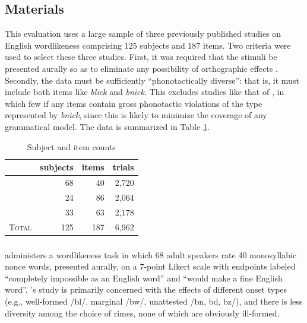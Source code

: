 \subsection{Materials}

This evaluation uses a large sample of three previously published studies on English wordlikeness comprising 125 subjects and 187 items. Two criteria were used to select these three studies. First, it was required that the stimuli be presented aurally so as to eliminate any possibility of orthographic effects \citep[e.g.,][]{Berent2001b,Berent2008b}. Secondly, the data must be sufficiently ``phonotactically diverse'': that is, it must include both items like \emph{blick} and \emph{bnick}. This excludes studies like that of \citet{Bailey2001}, in which few if any items contain gross phonotactic violations of the type represented by \emph{bnick}, since this is likely to minimize the coverage of any grammatical model. The data is summarized in Table \ref{counts}.

\begin{table}
\centering
\begin{tabular}{l rrr}
\toprule
                           & subjects & items & trials \\
\midrule
\citeauthor{Albright2007}  & 68       & 40    & 2,720  \\
\citeauthor{Albright2003b} & 24       & 86    & 2,064  \\
\citeauthor{Scholes1966}   & 33       & 63    & 2,178  \\
\midrule
\textsc{Total}             & 125      & 187   & 6,962  \\
\bottomrule
\end{tabular}
\caption{Subject and item counts}
\label{counts}
\end{table}

\subsubsection{\citealt{Albright2007}}

\citet{Albright2007} administers a wordlikeness task in which 68 adult speakers rate 40 monosyllabic nonce words, presented aurally, on a 7-point Likert scale with endpoints labeled  ``completely impossible as an English word'' and ``would make a fine English word''. \citeauthor{Albright2007}'s study is primarily concerned with the effects of different onset types (e.g., well-formed /bl/, marginal /bw/, unattested /bn, bd, bz/), and there is less diversity among the choice of rimes, none of which are obviously ill-formed.

